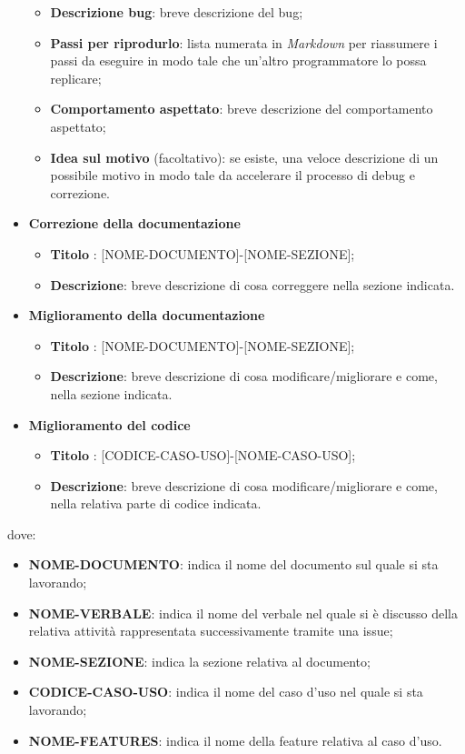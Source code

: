 \begin{itemize}
\begin{itemize}
                \item \textbf{Descrizione bug}: breve descrizione del bug;
                \item \textbf{Passi per riprodurlo}: lista numerata in \textit{Markdown} per riassumere i passi da eseguire in modo tale che un'altro programmatore lo possa replicare;
                \item \textbf{Comportamento aspettato}: breve descrizione del comportamento aspettato;
                \item \textbf{Idea sul motivo} (facoltativo): se esiste, una veloce descrizione di un possibile motivo in modo tale da accelerare il processo di debug e correzione.
            \end{itemize}
            \item  \textbf{Correzione della documentazione}
            \begin{itemize}
                \item \textbf{Titolo} : [NOME-DOCUMENTO]-[NOME-SEZIONE];
                \item \textbf{Descrizione}: breve descrizione di cosa correggere nella sezione indicata.
            \end{itemize}
            \item  \textbf{Miglioramento della documentazione}
            \begin{itemize}
                \item \textbf{Titolo} : [NOME-DOCUMENTO]-[NOME-SEZIONE];
                \item \textbf{Descrizione}: breve descrizione di cosa modificare/migliorare e come, nella sezione indicata.
            \end{itemize}
            \item  \textbf{Miglioramento del codice}
            \begin{itemize}
                 \item \textbf{Titolo} : [CODICE-CASO-USO]-[NOME-CASO-USO];
                 \item \textbf{Descrizione}: breve descrizione di cosa modificare/migliorare e come, nella relativa parte di codice indicata.
            \end{itemize}
        \end{itemize}
        dove:

        \begin{itemize}
            \item \textbf{NOME-DOCUMENTO}: indica il nome del documento sul quale si sta lavorando;
            \item \textbf{NOME-VERBALE}: indica il nome del verbale nel quale si è discusso della relativa attività rappresentata successivamente tramite una issue;
            \item \textbf{NOME-SEZIONE}: indica la sezione relativa al documento;
            \item \textbf{CODICE-CASO-USO}: indica il nome del caso d'uso nel quale si sta lavorando;
            \item \textbf{NOME-FEATURES}: indica il nome della feature relativa al caso d'uso.
        \end{itemize}


